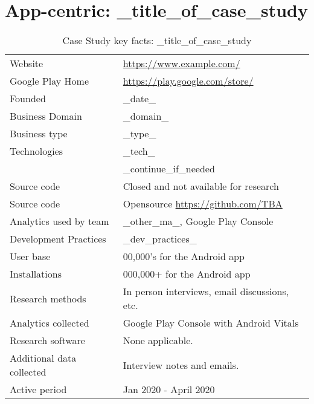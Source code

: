 \section{App-centric: _title_of_case_study} %

{\renewcommand{\arraystretch}{0.8}%
\begin{table}[htbp!]
    \centering
    \small
    \setlength{\tabcolsep}{1pt}
    \begin{tabular}{lp{9cm}}
       \toprule
       Website &\url{https://www.example.com/} \\
       Google Play Home & \url{https://play.google.com/store/} \\
       Founded & _date_ \\
       Business Domain & _domain_ \\
       Business type & _type_ \\
       Technologies  & _tech_ \\
       & _continue_if_needed \\
       Source code  &Closed and not available for research \\
       Source code  & Opensource \url{https://github.com/TBA} \\
       Analytics used by team & _other_ma_, Google Play Console \\
       Development Practices & _dev_practices_ \\
       \midrule
       User base & 00,000's for the Android app \\
       Installations & 000,000+ for the Android app \\
       \midrule
       Research methods &In person interviews, email discussions, etc. \\
       Analytics collected &Google Play Console with Android Vitals \\
       Research software & None applicable. \\
       Additional data collected &Interview notes and emails. \\
       Active period & Jan 2020 - April 2020 \\
       \bottomrule
    \end{tabular}
    \caption{Case Study key facts: _title_of_case_study}
    \label{tab:blank_case_study_anaytics_overview}
\end{table}
}

